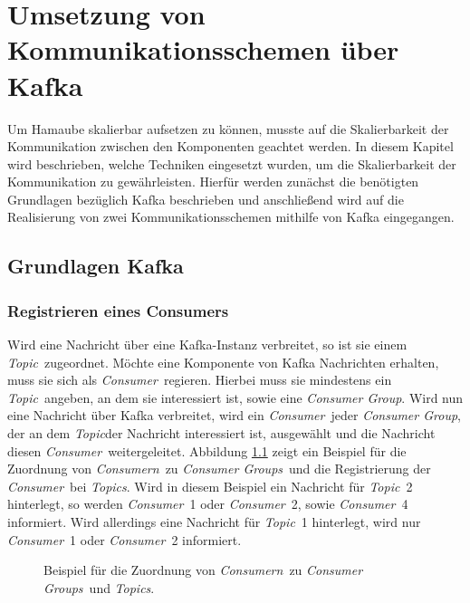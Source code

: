 \chapter{Umsetzung von Kommunikationsschemen über Kafka}
\newcommand{\C}{\textit{Consumer}}
\newcommand{\Cn}{\textit{Consumern}}
\newcommand{\CG}{\textit{Consumer Group}}
\newcommand{\CGs}{\textit{Consumer Groups}}
\newcommand{\T}{\textit{Topic}}
\newcommand{\Tcs}{\textit{Topics}}
\newcommand{\Pt}{\textit{Partition}}
\newcommand{\Pts}{\textit{Partitionen}}
\newcommand{\Pd}{\textit{Producer}}
\newcommand{\Evs}{\textit{Events}}
\newcommand{\Ev}{\textit{Event}}
Um Hamaube skalierbar aufsetzen zu können, musste auf die Skalierbarkeit der Kommunikation zwischen den Komponenten geachtet werden. In diesem Kapitel wird beschrieben, welche Techniken eingesetzt wurden, um die Skalierbarkeit der Kommunikation zu gewährleisten. Hierfür werden zunächst die benötigten Grundlagen bezüglich Kafka beschrieben und anschließend wird auf die Realisierung von zwei Kommunikationsschemen mithilfe von Kafka eingegangen.
\section{Grundlagen Kafka}
\subsection{Registrieren eines Consumers}
Wird eine Nachricht über eine Kafka-Instanz verbreitet, so ist sie einem \T\ zugeordnet.
Möchte eine Komponente von Kafka Nachrichten erhalten, muss sie sich als \C\ regieren. Hierbei muss sie mindestens ein \T\ angeben, an dem sie interessiert ist, sowie eine \CG. Wird nun eine Nachricht über Kafka verbreitet, wird ein \C\ jeder \CG, der an dem \T der Nachricht interessiert ist, ausgewählt und die Nachricht diesen \C\ weitergeleitet. Abbildung \ref{fig:exampleKafkaConsumerRegistration} zeigt ein Beispiel für die Zuordnung von \Cn\ zu \CGs\ und die Registrierung der \C\ bei \Tcs. Wird in diesem Beispiel ein Nachricht für \T\ 2 hinterlegt, so werden \C\ 1 oder \C\ 2, sowie \C\ 4 informiert. Wird allerdings eine Nachricht für \T\ 1 hinterlegt, wird nur \C\ 1 oder \C\ 2 informiert.
\begin{figure}
	\caption{Beispiel für die Zuordnung von \Cn\ zu \CGs\ und \Tcs.}
	\label{fig:exampleKafkaConsumerRegistration}
	\centering
\end{figure}
